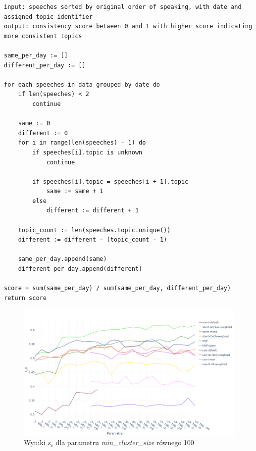 	\begin{lstlisting}[style=algorithm,label=lst:consistency_alg,caption=Algorytm obliczania spójności tematów]
input: speeches sorted by original order of speaking, with date and assigned topic identifier
output: consistency score between 0 and 1 with higher score indicating more consistent topics
	
same_per_day := []
different_per_day := []

for each speeches in data grouped by date do
	if len(speeches) < 2
		continue
	
	same := 0
	different := 0
	for i in range(len(speeches) - 1) do
		if speeches[i].topic is unknown
			continue

		if speeches[i].topic = speeches[i + 1].topic
			same := same + 1
		else
			different := different + 1

	topic_count := len(speeches.topic.unique())
	different := different - (topic_count - 1)
	
	same_per_day.append(same)
	different_per_day.append(different)

score = sum(same_per_day) / sum(same_per_day, different_per_day)
return score
	\end{lstlisting}

	\begin{figure}[htb]
		\centering
		\includegraphics[width=\linewidth]{rys05/s_c.png}
		\caption{Wyniki \(s_c\) dla parametru \emph{min\_cluster\_size} równego 100}\label{fig:consistency_score}
	\end{figure}

